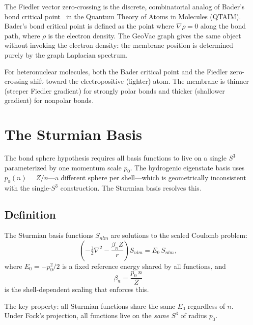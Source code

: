\documentclass[aps,pra,twocolumn,superscriptaddress,longbibliography]{revtex4-2}
\begin{document}
The Fiedler vector zero-crossing is the discrete, combinatorial analog
of Bader's bond critical point~\cite{Bader1990} in the Quantum Theory
of Atoms in Molecules (QTAIM).  Bader's bond critical point is defined
as the point where $\nabla\rho = 0$ along the bond path, where $\rho$
is the electron density.  The GeoVac graph gives the same object
without invoking the electron density: the membrane position is
determined purely by the graph Laplacian spectrum.

For heteronuclear molecules, both the Bader critical point and the
Fiedler zero-crossing shift toward the electropositive (lighter) atom.
The membrane is thinner (steeper Fiedler gradient) for strongly polar
bonds and thicker (shallower gradient) for nonpolar bonds.


\section{The Sturmian Basis}
\label{sec:sturmian}

The bond sphere hypothesis requires all basis functions to live on a
single $S^3$ parameterized by one momentum scale $p_0$.  The
hydrogenic eigenstate basis uses $p_0(n) = Z/n$---a different sphere
per shell---which is geometrically inconsistent with the single-$S^3$
construction.  The Sturmian basis resolves this.

\subsection{Definition}

The Sturmian basis functions $S_{nlm}$ are solutions to the scaled
Coulomb problem:
\begin{equation}
\left(-\tfrac{1}{2}\nabla^2 - \frac{\beta_n Z}{r}\right) S_{nlm}
  = E_0\, S_{nlm},
\label{eq:sturmian_eq}
\end{equation}
where $E_0 = -p_0^2/2$ is a fixed reference energy shared by all
functions, and
\begin{equation}
\beta_n = \frac{p_0\, n}{Z}
\label{eq:beta_n}
\end{equation}
is the shell-dependent scaling that enforces this.

The key property: all Sturmian functions share the same $E_0$
regardless of $n$.  Under Fock's projection, all functions live on
the \emph{same} $S^3$ of radius $p_0$.
\end{document}
